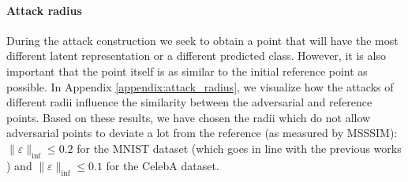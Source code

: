 \paragraph{Attack radius}
During the attack construction we seek to obtain a point that will have the most different latent representation or a different predicted class. However, it is also important that the point itself is as similar to the initial reference point as possible. In Appendix \ref{appendix:attack_radius}, we visualize how the attacks of different radii influence the similarity between the adversarial and reference points. Based on these results, we have chosen the radii which do not allow adversarial points to deviate a lot from the reference (as measured by \textsc{MSSSIM}): $\|\varepsilon\|_{\inf} \leq 0.2$ for the MNIST dataset (which goes in line with the previous works \cite{cemgil2020autoencoding, Cemgil2019-vn}) and $\|\varepsilon\|_{\inf} \leq 0.1$ for the CelebA dataset. 




